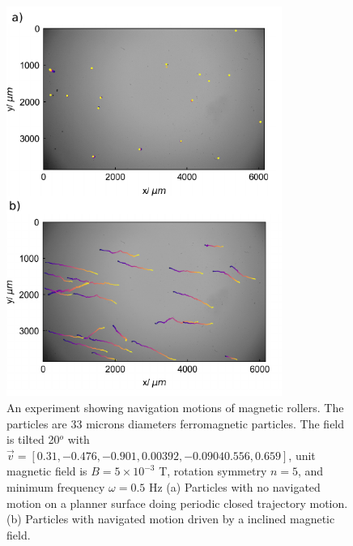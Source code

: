  \begin{figure}[p]
\centering
\includegraphics[width=9cm]{figures/5_6.pdf}
\caption{An experiment showing navigation motions of magnetic rollers. The particles are 33 microns diameters ferromagnetic particles. The field is tilted 20$^o$ with $\vec{v}=[0.31,-0.476,-0.901,0.00392, -0.0904
0.556,0.659]$, unit magnetic field is $B=5 \times 10^{-3}$ T, rotation symmetry $n=5$, and minimum frequency $\omega=0.5$ Hz (a) Particles with no navigated motion on a planner surface doing periodic closed trajectory motion.  (b) Particles with navigated motion driven by a inclined magnetic field.}
\label{fig:5.6}
\end{figure}
